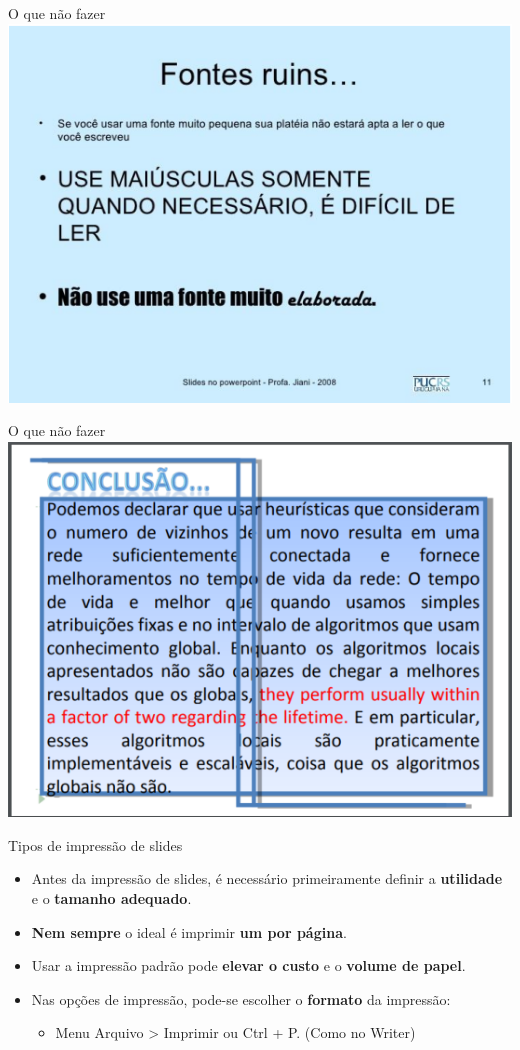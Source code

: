 \begin{frame}{O que não fazer}
	\centering
	\includegraphics[width=0.7\linewidth]{Figuras/Ch05/fig20}
\end{frame}


\begin{frame}{O que não fazer}
	\centering
	\includegraphics[width=0.7\linewidth]{Figuras/Ch05/fig21}
\end{frame}


\begin{frame}{Tipos de impressão de slides}
	\begin{block}{}
		\begin{itemize}
			\item Antes da impressão de slides, é necessário primeiramente definir a \textbf{utilidade} e o \textbf{tamanho adequado}.
			\item \textbf{Nem sempre} o ideal é imprimir \textbf{um por página}.
			\item Usar a impressão padrão pode \textbf{elevar o custo} e o \textbf{volume de papel}.
			\item Nas opções de impressão, pode-se escolher o \textbf{formato} da impressão:
			\begin{itemize}
				\item Menu Arquivo > Imprimir ou Ctrl + P. (Como no Writer)
			\end{itemize}
		\end{itemize}
	\end{block}

\end{frame}


